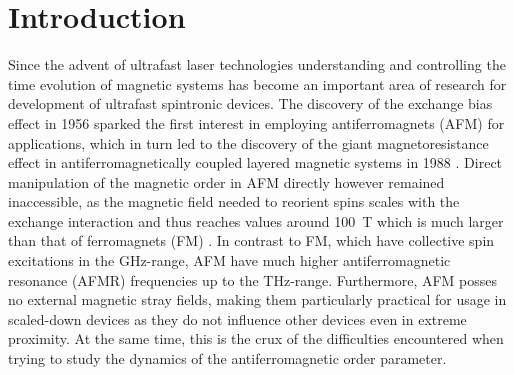 \chapter{Introduction}
Since the advent of ultrafast laser technologies understanding and controlling the time evolution of magnetic systems has become an important area of research for development of ultrafast spintronic devices.
The discovery of the exchange bias effect in 1956 \cite{meiklejohn_new_1957} sparked the first interest in employing antiferromagnets (AFM) for applications, which in turn led to the discovery of the giant magnetoresistance effect in antiferromagnetically coupled layered magnetic systems in 1988 \cite{binasch_enhanced_1989, camley_theory_1989}.
Direct manipulation of the magnetic order in AFM directly however remained inaccessible, as the magnetic field needed to reorient spins scales with the exchange interaction and thus reaches values around \qty{100}{T} which is much larger than that of ferromagnets (FM) \cite{nemec_antiferromagnetic_2018}.
In contrast to FM, which have collective spin excitations in the GHz-range, AFM have much higher antiferromagnetic resonance (AFMR) frequencies up to the THz-range.
Furthermore, AFM posses no external magnetic stray fields, making them particularly practical for usage in scaled-down devices as they do not influence other devices even in extreme proximity.
At the same time, this is the crux of the difficulties encountered when trying to study the dynamics of the antiferromagnetic order parameter.


